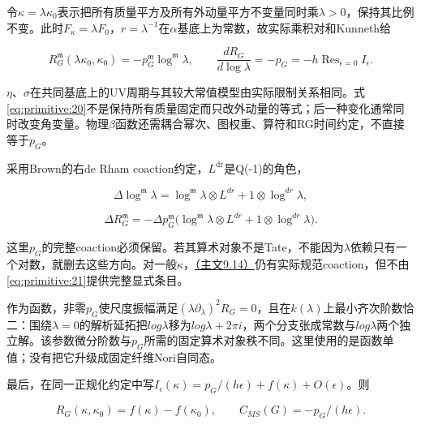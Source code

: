 \documentclass[11pt,a4paper,oneside]{ctexart}
\theoremstyle{cnplain}
\theoremstyle{definition}
\theoremstyle{remark}
\numberwithin{equation}{section}
\newcommand{\otherref}[2]{\href{#1.pdf}{#2}}
\begin{document}
令\(\kappa =\lambda \kappa _0\)表示把所有质量平方及所有外动量平方不变量同时乘\(\lambda >0\)，保持其比例不变。此时\(F_\kappa =\lambda F_0\)，\(r=\lambda ^{-1}\)在\(\alpha \)基底上为常数，故实际乘积对和Kunneth给

\begin{equation}
R_G^{\mathfrak m}(\lambda\kappa_0,\kappa_0)
                       =-p_G^{\mathfrak m}\log^{\mathfrak m}\lambda,
 \qquad \frac{dR_G}{d\log\lambda}=-p_G
                         =-h\operatorname{Res}_{\epsilon=0}I_\epsilon.      \label{eq:primitive:20}
\end{equation}

\(\eta \)、\(\sigma \)在共同基底上的UV周期与其较大常值模型由实际限制关系相同。式\eqref{eq:primitive:20}不是保持所有质量固定而只改外动量的等式；后一种变化通常同时改变角变量。物理\(\beta \)函数还需耦合幂次、图权重、算符和RG时间约定，不直接等于\(p_G\)。

采用Brown\cite{brownperiods}的右de Rham coaction约定，\(L^{\mathrm{dr}}\)是Q(-1)的角色，

\begin{equation}
\Delta\log^{\mathfrak m}\lambda
   =\log^{\mathfrak m}\lambda\otimes L^{dr}
                         +1\otimes\log^{dr}\lambda,
\end{equation}

\begin{equation}
\Delta R_G^{\mathfrak m}
  =-\Delta p_G^{\mathfrak m}
       \big(\log^{\mathfrak m}\lambda\otimes L^{dr}
                              +1\otimes\log^{dr}\lambda\big).              \label{eq:primitive:21}
\end{equation}

这里\(p_G\)的完整coaction必须保留。若其算术对象不是Tate，不能因为\(\lambda \)依赖只有一个对数，就删去这些方向。对一般\(\kappa \)，\otherref{feynman_periods_long_paper}{（主文9.14）}仍有实际规范coaction，但不由\eqref{eq:primitive:21}提供完整显式条目。

作为函数，非零\(p_G\)使尺度振幅满足\((\lambda\partial_\lambda)^2R_G=0\)，且在\(k(\lambda )\)上最小齐次阶数恰二：围绕\(\lambda =0\)的解析延拓把\(log \lambda \)移为\(log \lambda +2\pi i\)，两个分支张成常数与\(log \lambda \)两个独立解。该参数微分阶数与\(p_G\)所需的固定算术对象秩不同。这里使用的是函数单值；没有把它升级成固定纤维Nori自同态。

最后，在同一正规化约定中写\(I_\epsilon (\kappa )=p_G/(h\epsilon )+f(\kappa )+O(\epsilon )\)。则

\begin{equation}
R_G(\kappa,\kappa_0)=f(\kappa)-f(\kappa_0),\qquad
                 C_{MS}(G)=-p_G/(h\epsilon).                    \label{eq:primitive:22}
\end{equation}
\end{document}
